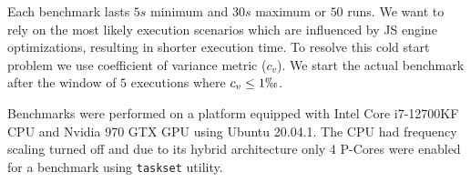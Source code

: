 
Each benchmark lasts $5s$ minimum and $30s$ maximum or $50$ runs. We want to rely on the most likely execution scenarios which are influenced by JS engine optimizations, resulting in shorter execution time. To resolve this cold start problem we use coefficient of variance metric ($c_v$). We start the actual benchmark after the window of $5$ executions where $c_v \le 1\permil$.


Benchmarks were performed on a platform equipped with Intel\textsuperscript{\tiny\textregistered} Core\textsuperscript{\tiny\texttrademark} i7-12700KF CPU and Nvidia 970 GTX GPU using Ubuntu 20.04.1. The CPU had frequency scaling turned off and due to its hybrid architecture only 4 P-Cores were enabled for a benchmark using \texttt{taskset} utility.
